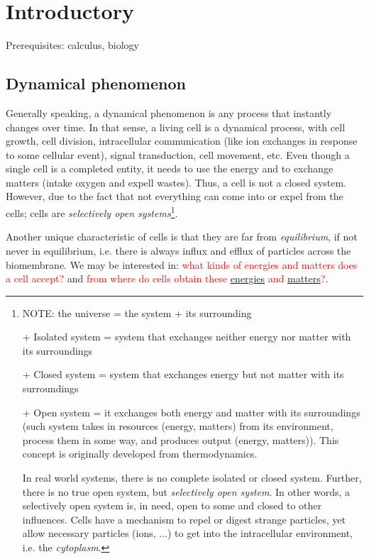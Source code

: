  
\chapter{Introductory}
\label{chap:introductory}
Prerequisites: calculus, biology

\section{Dynamical phenomenon}
\label{sec:dynamic-phenomena}

Generally speaking, a dynamical phenomenon is any process that instantly changes
over time. In that sense, a living cell is a dynamical process, with cell
growth, cell division, intracellular communication (like ion exchanges in
response to some cellular event), signal transduction, cell movement, etc. Even
though a single cell is a completed entity, it needs to use the energy and to
exchange matters (intake oxygen and expell wastes). Thus, a cell is not a closed
system. However, due to the fact that not everything can come into or expel from
the cells; cells are {\it selectively open
  systems}\footnote{ NOTE: the universe = the system + its surrounding

  + Isolated system = system that exchanges neither energy nor matter
  with its surroundings

  + Closed system = system that exchanges energy but not matter with
  its surroundings

  + Open system = it exchanges both energy and matter with its
  surroundings (such system takes in resources (energy, matters) from
  its environment, process them in some way, and produces output
  (energy, matters)). This concept is originally developed from
  thermodynamics.

  In real world systems, there is no complete isolated or closed
  system. Further, there is no true open system, but
  {\it selectively open system}. In other words, a selectively open
  system is, in need, open to some and closed to other influences.
  Cells have a mechanism to repel or digest strange particles, yet
  allow necessary particles (ions, ...)  to get into the
  intracellular environment, i.e. the {\it cytoplasm}.  }.

Another unique characteristic of cells is that they are far from
{\it equilibrium}, if not never in equilibrium, i.e. there is always
influx and efflux of particles across the biomembrane.  We may be
interested in:
\textcolor{red}{what kinds of energies and matters does a cell
  accept?}
and
\textcolor{red}{from where do cells obtain these
  \hyperref[sec:resources-energy]{energies} and
  \hyperref[sec:resources-matters]{matters}?}.

